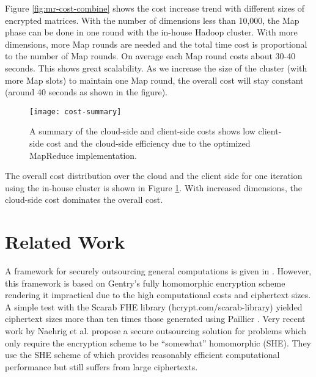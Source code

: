 \documentclass[10pt, conference, compsocconf]{IEEEtran}
\begin{document}
Figure \ref{fig:mr-cost-combine} shows the cost increase trend with different sizes of encrypted matrices. With the number of dimensions less than 10,000, the Map phase can be done in one round with the in-house Hadoop cluster. With more dimensions, more Map rounds are needed and the total time cost is proportional to the number of Map rounds. On average each Map round costs about 30-40 seconds. This shows great scalability. As we increase the size of the cluster (with more Map slots) to maintain one Map round, the overall cost will stay constant (around 40 seconds as shown in the figure). 

\begin{figure}[tbh]
\centering
\begin{minipage}{.9\linewidth}
\centering
\texttt{[image: cost-summary]}
\vspace{-0.75cm}
\caption{ A summary of the cloud-side and client-side costs shows low client-side cost and the cloud-side efficiency due to the optimized MapReduce implementation. \newline }
\label{fig:cost-summary}
\end{minipage}
\end{figure}
\vspace{-0.5cm}

The overall cost distribution over the cloud and the client side for one iteration using the in-house cluster is shown in Figure \ref{fig:cost-summary}. With increased dimensions, the cloud-side cost dominates the overall cost.

   

\section{Related Work}\label{sec:related}
A framework for securely outsourcing general computations is given in \cite{gennaro10}.  However, this framework is based on Gentry's fully homomorphic encryption scheme \cite{gentry09} rendering it impractical due to the high computational costs and ciphertext sizes.  A simple test with the Scarab FHE library (hcrypt.com/scarab-library)  yielded ciphertext sizes more than ten times those generated using Paillier \cite{paillier99}.  Very recent work by Naehrig et al. \cite{naehrig11} propose a secure outsourcing solution for problems which only require the encryption scheme to be ``somewhat'' homomorphic (SHE).  They use the SHE scheme of \cite{bv11a} which provides reasonably efficient computational performance but still suffers from large ciphertexts.
\end{document}
